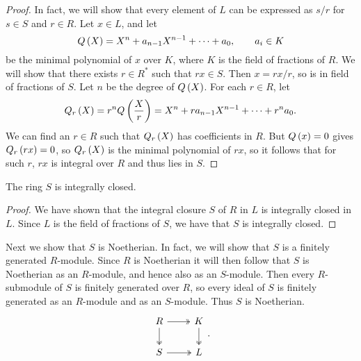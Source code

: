 \begin{proof}
In fact, we will show that every element of $ L $ can be expressed as $ s / r $ for $ s \in S $ and $ r \in R $. Let $ x \in L $, and let
$$ Q\left( X \right) = X^n + a_{n - 1}X^{n - 1} + \dots + a_0, \qquad a_i \in K $$
be the minimal polynomial of $ x $ over $ K $, where $ K $ is the field of fractions of $ R $. We will show that there exists $ r \in R^* $ such that $ rx \in S $. Then $ x = rx / r $, so is in field of fractions of $ S $. Let $ n $ be the degree of $ Q\left( X \right) $. For each $ r \in R $, let
$$ Q_r\left( X \right) = r^nQ\left( \dfrac{X}{r} \right) = X^n + ra_{n - 1}X^{n - 1} + \dots + r^na_0. $$
We can find an $ r \in R $ such that $ Q_r\left( X \right) $ has coefficients in $ R $. But $ Q\left( x \right) = 0 $ gives $ Q_r\left( rx \right) = 0 $, so $ Q_r\left( X \right) $ is the minimal polynomial of $ rx $, so it follows that for such $ r $, $ rx $ is integral over $ R $ and thus lies in $ S $.
\end{proof}

\begin{corollary}
The ring $ S $ is integrally closed.
\end{corollary}

\begin{proof}
We have shown that the integral closure $ S $ of $ R $ in $ L $ is integrally closed in $ L $. Since $ L $ is the field of fractions of $ S $, we have that $ S $ is integrally closed.
\end{proof}

Next we show that $ S $ is Noetherian. In fact, we will show that $ S $ is a finitely generated $ R $-module. Since $ R $ is Noetherian it will then follow that $ S $ is Noetherian as an $ R $-module, and hence also as an $ S $-module. Then every $ R $-submodule of $ S $ is finitely generated over $ R $, so every ideal of $ S $ is finitely generated as an $ R $-module and as an $ S $-module. Thus $ S $ is Noetherian.
$$
\begin{tikzcd}
R \arrow[twoheadrightarrow]{r} \arrow[twoheadrightarrow]{d} & K \arrow[twoheadrightarrow]{d} \\
S \arrow[twoheadrightarrow]{r} & L
\end{tikzcd}.
$$

\pagebreak


